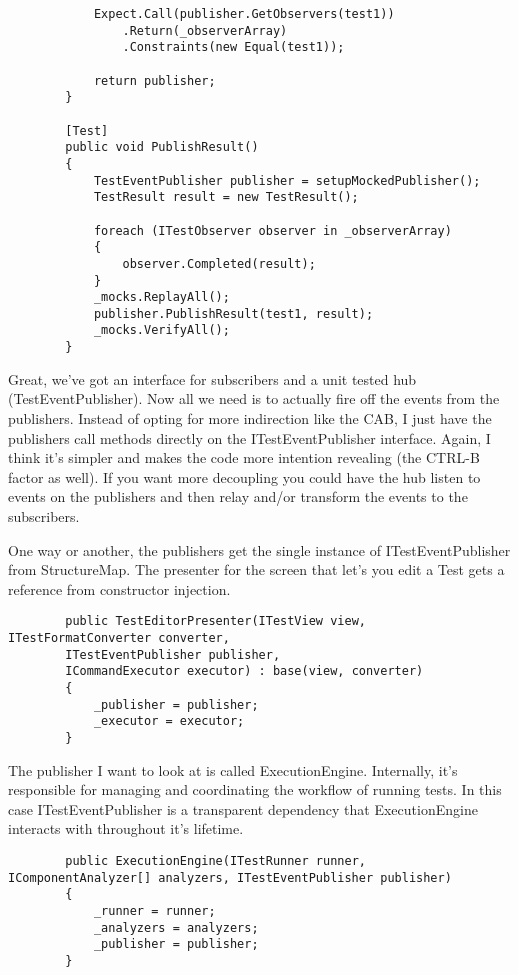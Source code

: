 \documentclass{article}
\begin{document}
{\begin{lstlisting}
            Expect.Call(publisher.GetObservers(test1))
                .Return(_observerArray)
                .Constraints(new Equal(test1)); 

            return publisher;
        } 

        [Test]
        public void PublishResult()
        {
            TestEventPublisher publisher = setupMockedPublisher();
            TestResult result = new TestResult();

            foreach (ITestObserver observer in _observerArray)
            {
                observer.Completed(result);
            }
            _mocks.ReplayAll();
            publisher.PublishResult(test1, result);
            _mocks.VerifyAll();
        }

 \end{lstlisting}

Great, we've got an interface for subscribers and a unit tested hub (TestEventPublisher).  Now all we need is to actually fire off the events from the publishers.  Instead of opting for more indirection like the CAB, I just have the publishers call methods directly on the ITestEventPublisher interface.  Again, I think it's simpler and makes the code more intention revealing (the CTRL-B factor as well).  If you want more decoupling you could have the hub listen to events on the publishers and then relay and/or transform the events to the subscribers. 

One way or another, the publishers get the single instance of ITestEventPublisher from StructureMap.  The presenter for the screen that let's you edit a Test gets a reference from constructor injection.

 \begin{lstlisting}
        public TestEditorPresenter(ITestView view, ITestFormatConverter converter,
		ITestEventPublisher publisher,
        ICommandExecutor executor) : base(view, converter)
        {
            _publisher = publisher;
            _executor = executor;
        }
\end{lstlisting}

The publisher I want to look at is called ExecutionEngine.  Internally, it's responsible for managing and coordinating the workflow of running tests.  In this case ITestEventPublisher is a transparent dependency that ExecutionEngine interacts with throughout it's lifetime.

\begin{lstlisting}
        public ExecutionEngine(ITestRunner runner, IComponentAnalyzer[] analyzers, ITestEventPublisher publisher)
        {
            _runner = runner;
            _analyzers = analyzers;
            _publisher = publisher;
        }
\end{lstlisting}

}
\end{document}
